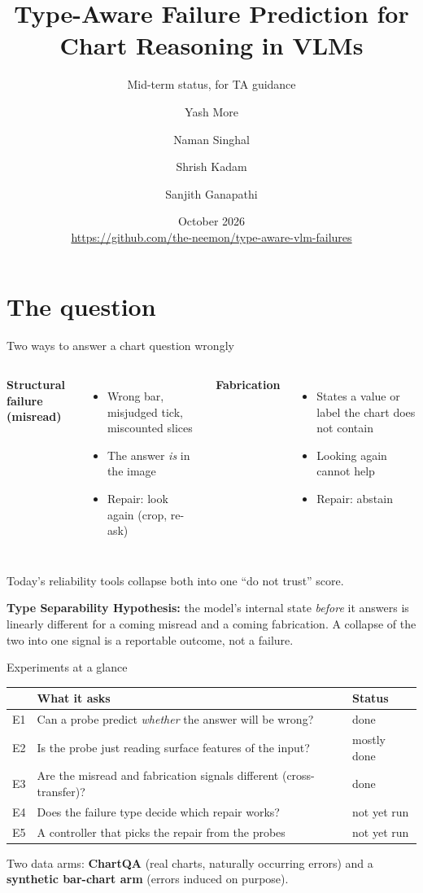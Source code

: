 \documentclass[10pt,aspectratio=169]{beamer}
\title{Type-Aware Failure Prediction for Chart Reasoning in VLMs}
\subtitle{Mid-term status, for TA guidance}
\author{Yash More \and Naman Singhal \and Shrish Kadam \and Sanjith Ganapathi}
\institute{ANLP course project, IIIT Hyderabad}
\date{October 2026\\[0.4em]\footnotesize\url{https://github.com/the-neemon/type-aware-vlm-failures}}
\newcommand{\hl}[1]{\alert{\textbf{#1}}}
\begin{document}
\maketitle

\section{The question}

\begin{frame}{Two ways to answer a chart question wrongly}
\begin{columns}[T]
\textbf{Structural failure (misread)}
\begin{itemize}
\item Wrong bar, misjudged tick, miscounted slices
\item The answer \emph{is} in the image
\item Repair: look again (crop, re-ask)
\end{itemize}
\textbf{Fabrication}
\begin{itemize}
\item States a value or label the chart does not contain
\item Looking again cannot help
\item Repair: abstain
\end{itemize}
\end{columns}
\vspace{1em}
Today's reliability tools collapse both into one ``do not trust'' score.
\vspace{0.5em}

\hl{Type Separability Hypothesis:} the model's internal state \emph{before} it
answers is linearly different for a coming misread and a coming fabrication.
A collapse of the two into one signal is a reportable outcome, not a failure.
\end{frame}

\begin{frame}{Experiments at a glance}
\begin{tabular}{lp{}l}
\toprule
& What it asks & Status \\
\midrule
E1 & Can a probe predict \emph{whether} the answer will be wrong? & done \\
E2 & Is the probe just reading surface features of the input? & mostly done \\
E3 & Are the misread and fabrication signals different (cross-transfer)? & done \\
E4 & Does the failure type decide which repair works? & not yet run \\
E5 & A controller that picks the repair from the probes & not yet run \\
\bottomrule
\end{tabular}
\vspace{1em}

Two data arms: \textbf{ChartQA} (real charts, naturally occurring errors) and a
\textbf{synthetic bar-chart arm} (errors induced on purpose).
\end{frame}
\end{document}
